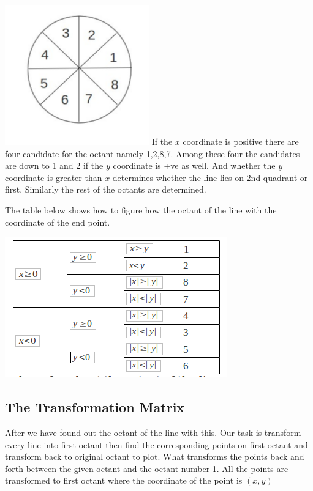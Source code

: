 \documentclass[a4paper,12pt,oneside]{book}
\begin{document}
\includegraphics[scale=1.0]{Files/Images/OctantNumbered.png}
If the $x$ coordinate is positive there are four candidate for the octant namely 1,2,8,7. Among these four the candidates are down to 1 and 2 if the $y$ coordinate is +ve as well. And whether the $y$ coordinate is greater than $x$ determines whether the line lies on 2nd quadrant or first. Similarly the rest of the octants are determined. 

The table below shows how to figure how the octant of the line with the coordinate of the end point.

\includegraphics[scale=1.0]{Files/Images/FindingOctant.png}



\subsection{The Transformation Matrix}
After we have found out the octant of the line with this. Our task is transform every line into first octant then find the corresponding points on first octant and transform back to original octant to plot.
What transforms the points back and forth between the given octant and the octant number 1. All the points are transformed to first octant where the coordinate of the point is $(x,y)$
\end{document}
